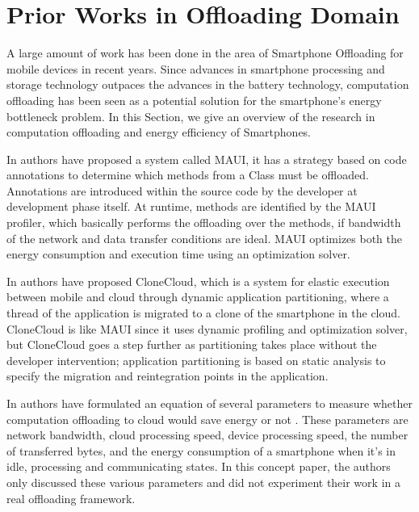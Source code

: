 \documentclass{report}
\begin{document}
\chapter{Prior Works in Offloading Domain} %
\label{chap:RelatedWork}

A large amount of work has been done in the area of Smartphone Offloading for mobile devices in
recent years. Since advances in smartphone processing and storage technology outpaces the advances in the battery
technology, computation offloading has been seen as a potential solution for the smartphone’s energy bottleneck problem.
In this Section, we give an overview of the research in computation offloading and energy efficiency of Smartphones.

In \cite{cuervo2010maui} authors have proposed a system called MAUI, it has a strategy based on code annotations to determine which methods from a Class must be offloaded. Annotations are introduced within the source code by the developer at development phase itself. At runtime, methods are identified by the MAUI profiler, which basically performs the offloading over the methods, if bandwidth of the network and data transfer conditions are ideal. MAUI optimizes both the energy consumption and execution
time using an optimization solver.

In \cite{chun2011clonecloud} authors have proposed CloneCloud, which is a system for elastic execution between mobile and
cloud through dynamic application partitioning, where a thread of the application is migrated to a clone of the
smartphone in the cloud. CloneCloud is like MAUI since it uses dynamic profiling and optimization solver, but CloneCloud goes a step further as partitioning takes place without the developer intervention; application partitioning is based on static analysis to specify the migration and reintegration points in the application. 

In \cite{kumar2010cloud} authors have formulated an equation of several parameters
to measure whether computation offloading to cloud would
save energy or not . These parameters are network
bandwidth, cloud processing speed, device processing
speed, the number of transferred bytes, and the energy
consumption of a smartphone when it’s in idle, processing
and communicating states. In this concept paper, the
authors only discussed these various parameters and did not
experiment their work in a real offloading framework.
\end{document}
